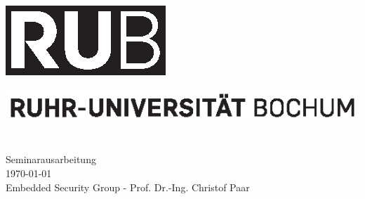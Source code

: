 %
%

\frontmatter

\begin{titlepage}
 \enlargethispage{3cm}
 \vspace*{-32mm}\hspace*{120mm}
 \includegraphics[scale=1.0]{rub_logo.eps}
 
 \vspace*{12cm}\hspace*{0mm}
 \begin{minipage}[b]{1\linewidth}
  \sffamily
  \hspace{-17.2mm}\includegraphics[scale=1.0]{rub_slogan.eps}\\
  
  \nohyphens{
   {\bf \LARGE \sffamily {\thtitle}}
  }\\
  
  \large{
   \thauthor
  }\\
  
  \vspace*{35mm}
  \normalsize{
   Seminarausarbeitung\\
   \today\\
   Embedded Security Group - Prof. Dr.-Ing. Christof Paar\\
  }
 \end{minipage}
\end{titlepage}


\newpage\thispagestyle{empty}
